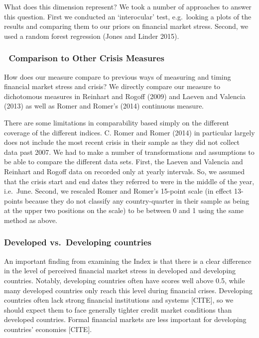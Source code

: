 \documentclass[]{article}
\begin{document}
What does this dimension represent? We took a number of approaches to
answer this question. First we conducted an `interocular' test,
e.g.~looking a plots of the results and comparing them to our priors on
financial market stress. Second, we used a random forest regression
(Jones and Linder 2015).

\subsubsection{~Comparison to Other Crisis
Measures}\label{comparison-to-other-crisis-measures}

How does our measure compare to previous ways of measuring and timing
financial market stress and crisis? We directly compare our measure to
dichotomous measures in Reinhart and Rogoff (2009) and Laeven and
Valencia (2013) as well as Romer and Romer's (2014) continuous measure.

There are some limitations in comparability based simply on the
different coverage of the different indices. C. Romer and Romer (2014)
in particular largely does not include the most recent crisis in their
sample as they did not collect data past 2007. We had to make a number
of transformations and assumptions to be able to compare the different
data sets. First, the Laeven and Valencia and Reinhart and Rogoff data
on recorded only at yearly intervals. So, we assumed that the crisis
start and end dates they referred to were in the middle of the year,
i.e.~June. Second, we rescaled Romer and Romer's 15-point scale (in
effect 13-points because they do not classify any country-quarter in
their sample as being at the upper two positions on the scale) to be
between 0 and 1 using the same method as above.

\subsubsection{Developed vs.~Developing
countries}\label{developed-vs.developing-countries}

An important finding from examining the Index is that there is a clear
difference in the level of perceived financial market stress in
developed and developing countries. Notably, developing countries often
have scores well above 0.5, while many developed countries only reach
this level during financial crises. Developing countries often lack
strong financial institutions and systems {[}CITE{]}, so we should
expect them to face generally tighter credit market conditions than
developed countries. Formal financial markets are less important for
developing countries' economies {[}CITE{]}.
\end{document}

